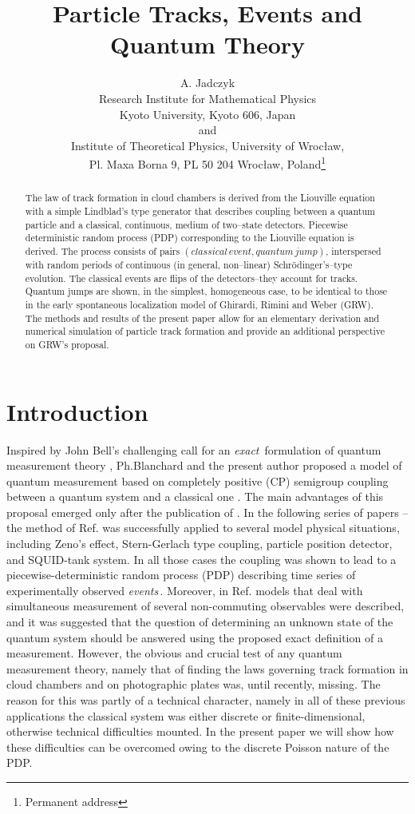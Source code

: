 \documentclass[12pt]{article}
\author{A. Jadczyk \\
 Research Institute for Mathematical
Physics\\ Kyoto University, Kyoto 606, Japan \\and\\
Institute of
Theoretical Physics, University of Wroc{\l }aw, \\ Pl. Maxa Borna 9, PL 50
204 Wroc{\l }aw, Poland\thanks{Permanent address}}
\title{Particle Tracks, Events and Quantum Theory}
\date{ }
\begin{document}
\maketitle
\begin{abstract} The law of track formation in cloud chambers is derived
from the Liouville equation with a simple Lindblad's type generator that
describes coupling between a quantum particle and a classical, continuous,
medium of two--state detectors. Piecewise deterministic random process
(PDP) corresponding to the Liouville equation is derived. The process
consists of pairs $(classical\, event, quantum\, jump)$, interspersed with
random periods of continuous (in general, non--linear)
Schr\"odinger's--type evolution. The classical events are flips of the
detectors--they account for tracks. Quantum jumps are shown, in the
simplest, homogeneous case, to be identical to those in the early
spontaneous localization model of Ghirardi, Rimini and Weber (GRW). The
methods and results of the present paper allow for an elementary derivation
and numerical simulation of particle track formation and provide an
additional perspective on GRW's proposal. \end{abstract}
\newpage
\section{Introduction}
Inspired by John Bell's challenging call for an {\sl exact}\, formulation
of quantum measurement theory \cite{bel1,bel2}, Ph.Blanchard and the
present author proposed a model of quantum measurement based on completely
positive (CP) semigroup coupling between a quantum system and a classical
one \cite{bla1}. The main advantages of this proposal emerged only after
the publication of \cite{bla1}. In the following series of papers
\cite{bla2}--\cite{bla5} the method of Ref. \cite{bla1} was successfully
applied to several model physical situations, including Zeno's effect,
Stern-Gerlach type coupling, particle position detector, and SQUID-tank
system. In all those cases the coupling was shown to lead to a piecewise-deterministic 
random process (PDP) describing time series of experimentally
observed {\sl events}\,. Moreover, in Ref. \cite{jad1} models that deal
with simultaneous measurement of several non-commuting observables were
described, and it was suggested that the question of determining an unknown
state of the quantum system should be answered using the proposed exact
definition of a measurement. However, the obvious and crucial test of any
quantum measurement theory, namely that of finding the laws governing track
formation in cloud chambers and on photographic plates was, until recently,
missing. The reason for this was partly of a technical character, namely in
all of these previous applications the classical system was either discrete
or finite-dimensional, otherwise technical difficulties mounted. In the
present paper we will show how these difficulties can be overcomed owing to
the discrete Poisson nature of the PDP.
\end{document}

